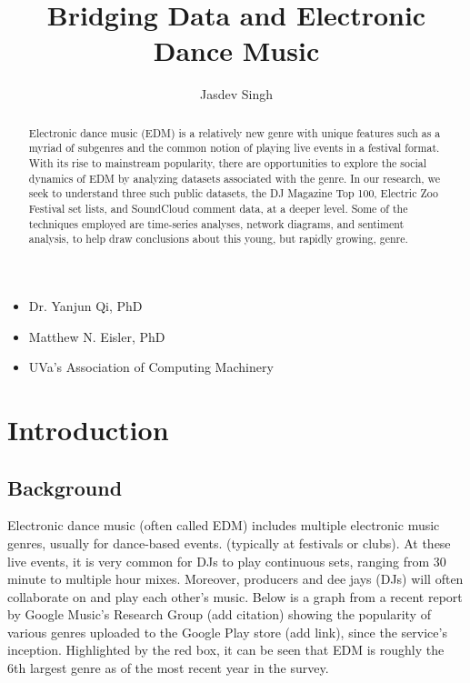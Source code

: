 \documentclass[12pt]{dalcsthesis}
\begin{document}
\mcs 
\title{Bridging Data and Electronic Dance Music}
\author{Jasdev Singh}


\nolistoftables
\nolistoffigures

\frontmatter

\begin{abstract}
Electronic dance music (EDM) is a relatively new genre with unique features such as a myriad of subgenres and the common notion of playing live events in a festival format. With its rise to mainstream popularity, there are opportunities to explore the social dynamics of EDM by analyzing datasets associated with the genre. In our research, we seek to understand three such public datasets, the DJ Magazine Top 100, Electric Zoo Festival set lists, and SoundCloud comment data, at a deeper level. Some of the techniques employed are time-series analyses, network diagrams, and sentiment analysis, to help draw conclusions about this young, but rapidly growing, genre.
\end{abstract}

\begin{acknowledgements}
\begin{itemize}
	\item Dr. Yanjun Qi, PhD
	\item Matthew N. Eisler, PhD
	\item UVa's Association of Computing Machinery
\end{itemize}
\end{acknowledgements}

\mainmatter

\chapter{Introduction}

\section{Background}

Electronic dance music (often called EDM) includes multiple electronic music genres, usually for dance-based events. (typically at festivals or clubs). At these live events, it is very common for DJs to play continuous sets, ranging from 30 minute to multiple hour mixes. Moreover, producers and dee jays (DJs) will often collaborate on and play each other's music. Below is a graph from a recent report by Google Music's Research Group (add citation) showing the popularity of various genres uploaded to the Google Play store (add link), since the service's inception. Highlighted by the red box, it can be seen that EDM is roughly the 6th largest genre as of the most recent year in the survey.
\end{document}

